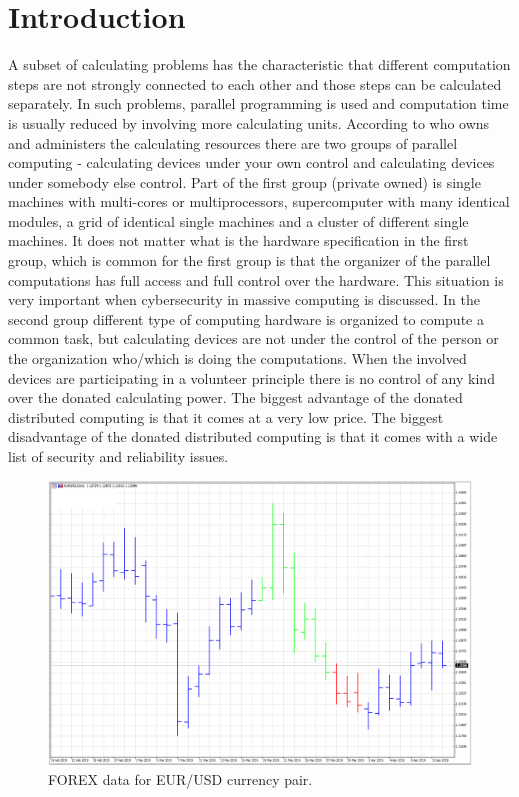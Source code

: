 \documentclass[graybox]{svmult}
\begin{document}
\section{Introduction}
\label{sec:01}

A subset of calculating problems has the characteristic that different computation steps are not strongly connected to each other and those steps can be calculated separately. In such problems, parallel programming is used and computation time is usually reduced by involving more calculating units. According to who owns and administers the calculating resources there are two groups of parallel computing - calculating devices under your own control and calculating devices under somebody else control. Part of the first group (private owned) is single machines with multi-cores or multiprocessors, supercomputer with many identical modules, a grid of identical single machines and a cluster of different single machines. It does not matter what is the hardware specification in the first group, which is common for the first group is that the organizer of the parallel computations has full access and full control over the hardware. This situation is very important when cybersecurity in massive computing is discussed. In the second group different type of computing hardware is organized to compute a common task, but calculating devices are not under the control of the person or the organization who/which is doing the computations. When the involved devices are participating in a volunteer principle there is no control of any kind over the donated calculating power. The biggest advantage of the donated distributed computing is that it comes at a very low price. The biggest disadvantage of the donated distributed computing is that it comes with a wide list of security and reliability issues. 

\begin{figure}[b]
\sidecaption
\includegraphics[width=\textwidth]{fig01}
\caption{FOREX data for EUR/USD currency pair.}
\label{fig:01}
\end{figure}
\end{document}
